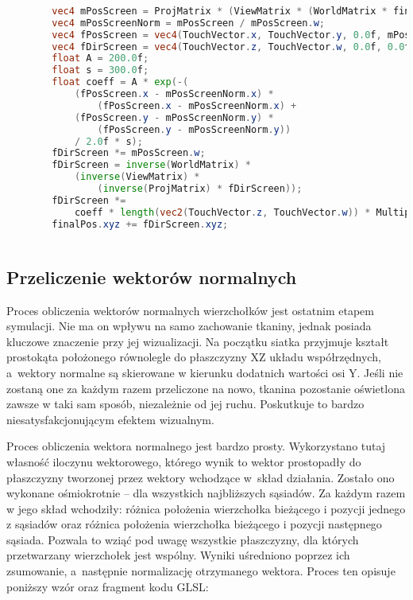 		\begin{lstlisting}[language=GLSL,caption={Obliczenie reakcji tkaniny na dotyk ekranu.},label={lst_5_4}]
		
		vec4 mPosScreen = ProjMatrix * (ViewMatrix * (WorldMatrix * finalPos));
		vec4 mPosScreenNorm = mPosScreen / mPosScreen.w;
		vec4 fPosScreen = vec4(TouchVector.x, TouchVector.y, 0.0f, mPosScreenNorm.w);
		vec4 fDirScreen = vec4(TouchVector.z, TouchVector.w, 0.0f, 0.0f);
		float A = 200.0f;
		float s = 300.0f;
		float coeff = A * exp(-(
			(fPosScreen.x - mPosScreenNorm.x) * 
				(fPosScreen.x - mPosScreenNorm.x) +
			(fPosScreen.y - mPosScreenNorm.y) * 
				(fPosScreen.y - mPosScreenNorm.y)) 
			/ 2.0f * s);
		fDirScreen *= mPosScreen.w;
		fDirScreen = inverse(WorldMatrix) * 
			(inverse(ViewMatrix) * 
				(inverse(ProjMatrix) * fDirScreen));
		fDirScreen *= 
			coeff * length(vec2(TouchVector.z, TouchVector.w)) * Multipliers.x;
		finalPos.xyz += fDirScreen.xyz;
		
		\end{lstlisting}
			
		\subsection{Przeliczenie wektorów normalnych}
		\label{t:symulacja:dzialanie:normalne}
			
		
		Proces obliczenia wektorów normalnych wierzchołków jest ostatnim etapem symulacji. Nie ma on wpływu na samo zachowanie tkaniny, jednak posiada kluczowe znaczenie przy jej wizualizacji. Na początku siatka przyjmuje kształt prostokąta położonego równolegle do płaszczyzny XZ układu współrzędnych, a~wektory normalne są skierowane w kierunku dodatnich wartości osi Y. Jeśli nie zostaną one za każdym razem przeliczone na nowo, tkanina pozostanie oświetlona zawsze w taki sam sposób, niezależnie od jej ruchu. Poskutkuje to bardzo niesatysfakcjonującym efektem wizualnym.
		
		Proces obliczenia wektora normalnego jest bardzo prosty. Wykorzystano tutaj własność iloczynu wektorowego, którego wynik to wektor prostopadły do płaszczyzny tworzonej przez wektory wchodzące w~skład działania. Zostało ono wykonane ośmiokrotnie -- dla wszystkich najbliższych sąsiadów. Za każdym razem w jego skład wchodziły: różnica położenia wierzchołka bieżącego i pozycji jednego z sąsiadów oraz różnica położenia wierzchołka bieżącego i pozycji następnego sąsiada. Pozwala to wziąć pod uwagę wszystkie płaszczyzny, dla których przetwarzany wierzchołek jest wspólny. Wyniki uśredniono poprzez ich zsumowanie, a~następnie normalizację otrzymanego wektora. Proces ten opisuje poniższy wzór oraz fragment kodu GLSL:
		

